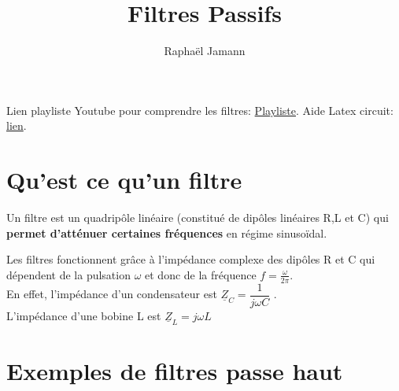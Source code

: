 \documentclass{article}
\title{Filtres Passifs}
\author{Raphaël Jamann}
\date{} %
\begin{document}
    \maketitle

    Lien playliste Youtube pour comprendre les filtres: \href{https://youtube.com/playlist?list=PLBRwdavN8jtvGuPq0_vqaGfYz1iMiCGmt&si=m3tA0icXFmadQLan}{Playliste}.
    Aide Latex circuit: \href{https://nboulaire.developpez.com/tutoriels/latex/circuitikz_base/}{lien}.

    \section{Qu'est ce qu'un filtre}
    
    Un filtre est un quadripôle linéaire (constitué de dipôles linéaires R,L et C) qui \textbf{permet
    d'atténuer certaines fréquences} en régime sinusoïdal. 

    \bigskip
    Les filtres fonctionnent grâce à l'impédance complexe des dipôles R et C qui dépendent
    de la pulsation $\omega$ et donc de la fréquence $f=\frac{\omega}{2\pi}$. \\
    En effet, l'impédance d'un condensateur est $\underline{Z}_C=\dfrac{1}{j\omega C}$ . \\
    L'impédance d'une bobine L est $\underline{Z}_L=j\omega L$


    \section{Exemples de filtres passe haut}
\end{document}
